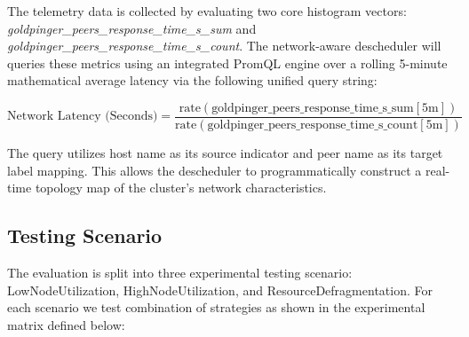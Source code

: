 The telemetry data is collected by evaluating two core histogram vectors: \textit{goldpinger\_peers\_response\_time\_s\_sum} and \textit{goldpinger\_peers\_response\_time\_s\_count}. The network-aware descheduler will queries these metrics using an integrated PromQL engine over a rolling 5-minute mathematical average latency via the following unified query string:

\[
\text{Network Latency (Seconds)} = \frac{\text{rate}(\text{goldpinger\_peers\_response\_time\_s\_sum}[5\text{m}])}{\text{rate}(\text{goldpinger\_peers\_response\_time\_s\_count}[5\text{m}])}
\]

The query utilizes host name as its source indicator and peer name as its target label mapping. This allows the descheduler to programmatically construct a real-time topology map of the cluster's network characteristics.


\subsection{Testing Scenario}
\label{subsec:netaware4_experimentalmatrix}
The evaluation is split into three experimental testing scenario: LowNodeUtilization, HighNodeUtilization, and ResourceDefragmentation. For each scenario we test combination of strategies as shown in the experimental matrix defined below:

\begin{table}[H]
    \centering
    \caption{Experimental Matrix Mapping for Latency and Defragmentation Trade-off Test}
    \label{tab:netaware4_experimentalmatrix}
\end{table}

